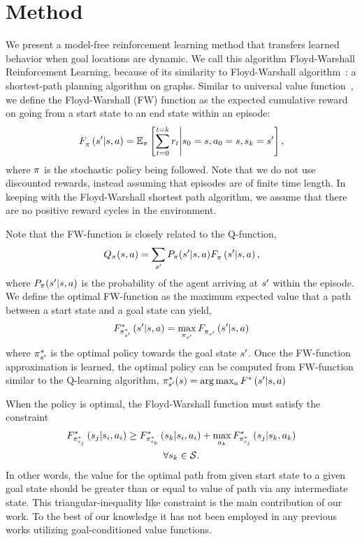 \section{Method}
\label{sec:method}
We present a model-free reinforcement learning method that transfers
learned behavior when goal locations are dynamic. We call this algorithm
Floyd-Warshall Reinforcement Learning, because of its similarity to
Floyd-Warshall algorithm~\cite{floydwarshall1962}:
a shortest-path planning algorithm on graphs. Similar
to universal value function~\cite{schaul2015universal}, we define the Floyd-Warshall
(FW) function as the expected cumulative reward on going from a start
state to an
end state within an episode:
%
\begin{align}
\fwargs{\state}{\act}{\state'}{\policy}{} =
\E_{\policy}\left[ \sum_{t=0}^{t=k} \rew_t \middle\vert \state_0 = \state, \act_0 = \state, \state_k = \state' \right] ,
\end{align}%
%
where $\policy$ is the
stochastic policy being followed.
Note that we do not use discounted rewards, instead assuming that episodes are
of finite time length. In keeping with the Floyd-Warshall shortest path
algorithm, we assume that there are no positive reward
cycles in the environment.

Note that the FW-function is closely related to the Q-function,
\begin{align}
  \Q_\policy(\state, \act) = \sum_{\state'} P_\policy(\state' | \state, \act) \fwargs{\state}{\act}{\state'}{\policy}{},
\end{align}%
%
where $P_\policy(\state' | \state, \act)$ is the probability of the agent
arriving at $\state'$ within the episode. We define the optimal FW-function as
the maximum expected value that a path between a start state and a goal state can
yield,
\begin{align}
\fwargs{\state}{\act}{\state'}{\policy^*_{\state'}}{*} =
\max_{\policy_{\state'}}  \fwargs{\state}{\act}{\state'}{\policy_{\state'}}{}
\end{align}%
where $\policy^*_{\state'}$ is the
optimal policy towards the goal state $\state'$. Once the
FW-function approximation is learned, the optimal policy can be computed from
FW-function similar to the Q-learning algorithm, $\policy^*_{\state'}(\state) =
\arg \max_{\act} \fwargs{\state}{\act}{\state'}{}{*}$

When the policy is optimal, the Floyd-Warshall function must satisfy the
constraint
%
\begin{multline}
\fwargs{\state_i}{\act_i}{\state_j}{\policy^*_{\state_j}}{*}
 \ge 
  \fwargs{\state_i}{\act_i}{\state_k}{\policy^*_{\state_k}}{*}
  + \max_{\act_k}\fwargs{\state_k}{\act_k}{\state_j}{\policy^*_{\state_j}}{*}
  \\
  \forall \state_k \in \State.
\end{multline}%
%
In other words, the value for the optimal path from given start state to a given
goal state should be greater than or equal to value of path via any intermediate
state.
This triangular-inequality like constraint is the main contribution of our work.
To the best of our knowledge it has not been employed in any previous works
utilizing goal-conditioned value functions.

